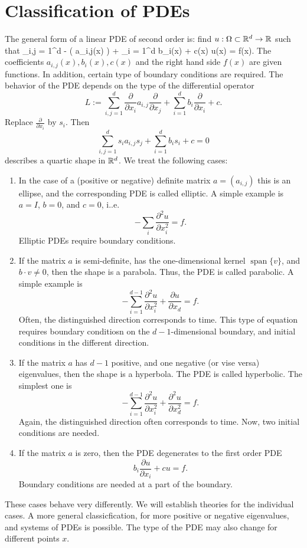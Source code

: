 \section{Classification of PDEs}
%
The general form of a linear PDE of second order is: find $u : \Omega \subset {\mathbb R}^d \rightarrow {\mathbb R}$ such that
\beq \label{general_pde}
\sum_{i,j = 1}^d 
- \big( a_{i,j}(x)   \big) + 
\sum_{i = 1}^d 
b_{i}(x)   +  c(x) u(x) = f(x).
\eeq
%
The coefficients $a_{i,j}(x), b_i(x), c(x)$ and the right hand side $f(x)$ are
given functions. In addition, certain type of boundary conditions are
required. The behavior of the PDE depends on the type of the
differential operator
$$
L := 
\sum_{i,j = 1}^d 
\frac{\partial}{\partial x_i} a_{i,j} \frac{\partial}{\partial x_j}   + 
\sum_{i = 1}^d 
b_{i} \frac{\partial}{\partial x_i}   +  c.
$$
Replace $\frac{\partial}{\partial x_i}$ by $s_i$. Then
$$
\sum_{i,j = 1}^d s_i a_{i,j} s_j +  \sum_{i = 1}^d  b_{i} s_i  +  c = 0
$$
%
describes a quartic shape in ${\mathbb R}^d$. We treat the following cases:
\begin{enumerate}
\item
In the case of a (positive or negative) definite matrix $a = (a_{i,j})$ this is an
ellipse, and the corresponding PDE is called elliptic. A simple example is
$a = I$, $b = 0$, and $c = 0$, i..e.
$$
- \sum_i \frac{\partial^2 u}{\partial x_i^2} = f.
$$
Elliptic PDEs require boundary conditions.
\item
If the matrix $a$ is semi-definite, has the one-dimensional kernel $\operatorname{span} \{v \}$, and $b \cdot v \neq 0$, then the shape is a parabola. Thus, the PDE is called parabolic. A simple example is
$$
- \sum_{i=1}^{d-1} \frac{\partial^2 u}{\partial x_i^2} + \frac{\partial u}{\partial x_d} = f.
$$
Often, the distinguished direction corresponds to time. This type of equation requires boundary conditiosn on the $d-1$-dimensional boundary, and initial conditions in the different direction.
\item
If the matrix $a$ has $d-1$ positive, and one negative (or vise versa) eigenvalues, then the shape is a hyperbola. The PDE is called hyperbolic. The simplest one is
$$
- \sum_{i=1}^{d-1} \frac{\partial^2 u}{\partial x_i^2} + \frac{\partial^2 u}{\partial x_d^2} = f.
$$
Again, the distinguished direction often corresponds to time. Now, two initial conditions are needed.
\item
If the matrix $a$ is zero, then the PDE degenerates to the first order PDE
$$
b_{i} \frac{\partial u}{\partial x_i} +  c u = f.
$$
Boundary conditions are needed at a part of the boundary.
\end{enumerate}
%
These cases behave very differently. We will establish theories for
the individual cases.  A more general classicfication, for more
positive or negative eigenvalues, and systems of PDEs is possible. The
type of the PDE may also change for different points $x$.






